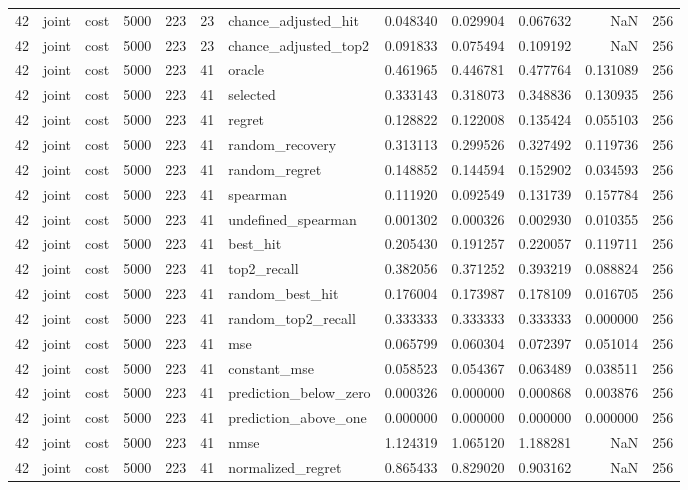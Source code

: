 \begin{tabular}{rllrrrlrrrrr}
42 & joint & cost & 5000 & 223 & 23 & chance_adjusted_hit & 0.048340 & 0.029904 & 0.067632 & NaN & 256 \\
42 & joint & cost & 5000 & 223 & 23 & chance_adjusted_top2 & 0.091833 & 0.075494 & 0.109192 & NaN & 256 \\
42 & joint & cost & 5000 & 223 & 41 & oracle & 0.461965 & 0.446781 & 0.477764 & 0.131089 & 256 \\
42 & joint & cost & 5000 & 223 & 41 & selected & 0.333143 & 0.318073 & 0.348836 & 0.130935 & 256 \\
42 & joint & cost & 5000 & 223 & 41 & regret & 0.128822 & 0.122008 & 0.135424 & 0.055103 & 256 \\
42 & joint & cost & 5000 & 223 & 41 & random_recovery & 0.313113 & 0.299526 & 0.327492 & 0.119736 & 256 \\
42 & joint & cost & 5000 & 223 & 41 & random_regret & 0.148852 & 0.144594 & 0.152902 & 0.034593 & 256 \\
42 & joint & cost & 5000 & 223 & 41 & spearman & 0.111920 & 0.092549 & 0.131739 & 0.157784 & 256 \\
42 & joint & cost & 5000 & 223 & 41 & undefined_spearman & 0.001302 & 0.000326 & 0.002930 & 0.010355 & 256 \\
42 & joint & cost & 5000 & 223 & 41 & best_hit & 0.205430 & 0.191257 & 0.220057 & 0.119711 & 256 \\
42 & joint & cost & 5000 & 223 & 41 & top2_recall & 0.382056 & 0.371252 & 0.393219 & 0.088824 & 256 \\
42 & joint & cost & 5000 & 223 & 41 & random_best_hit & 0.176004 & 0.173987 & 0.178109 & 0.016705 & 256 \\
42 & joint & cost & 5000 & 223 & 41 & random_top2_recall & 0.333333 & 0.333333 & 0.333333 & 0.000000 & 256 \\
42 & joint & cost & 5000 & 223 & 41 & mse & 0.065799 & 0.060304 & 0.072397 & 0.051014 & 256 \\
42 & joint & cost & 5000 & 223 & 41 & constant_mse & 0.058523 & 0.054367 & 0.063489 & 0.038511 & 256 \\
42 & joint & cost & 5000 & 223 & 41 & prediction_below_zero & 0.000326 & 0.000000 & 0.000868 & 0.003876 & 256 \\
42 & joint & cost & 5000 & 223 & 41 & prediction_above_one & 0.000000 & 0.000000 & 0.000000 & 0.000000 & 256 \\
42 & joint & cost & 5000 & 223 & 41 & nmse & 1.124319 & 1.065120 & 1.188281 & NaN & 256 \\
42 & joint & cost & 5000 & 223 & 41 & normalized_regret & 0.865433 & 0.829020 & 0.903162 & NaN & 256 \\

\end{tabular}
